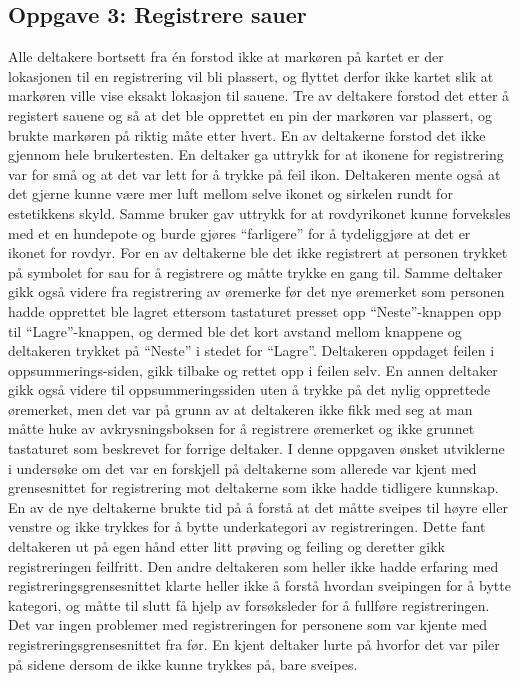 \subsection{Oppgave 3: Registrere sauer}
Alle deltakere bortsett fra én forstod ikke at markøren på kartet er der lokasjonen til en registrering vil bli plassert, og flyttet derfor ikke kartet slik at markøren ville vise eksakt lokasjon til sauene. Tre av deltakere forstod det etter å registert sauene og så at det ble opprettet en pin der markøren var plassert, og brukte markøren på riktig måte etter hvert. En av deltakerne forstod det ikke gjennom hele brukertesten. 
\newline
\newline
En deltaker ga uttrykk for at ikonene for registrering var for små og at det var lett for å trykke på feil ikon. Deltakeren mente også at det gjerne kunne være mer luft mellom selve ikonet og sirkelen rundt for estetikkens skyld. Samme bruker gav uttrykk for at rovdyrikonet kunne forveksles med et en hundepote og burde gjøres \enquote{farligere} for å tydeliggjøre at det er ikonet for rovdyr.
\newline
\newline
For en av deltakerne ble det ikke registrert at personen trykket på symbolet for sau for å registrere og måtte trykke en gang til. Samme deltaker gikk også videre fra registrering av øremerke før det nye øremerket som personen hadde opprettet ble lagret ettersom tastaturet presset opp \enquote{Neste}-knappen opp til \enquote{Lagre}-knappen, og dermed ble det kort avstand mellom knappene og deltakeren trykket på \enquote{Neste} i stedet for \enquote{Lagre}. Deltakeren oppdaget feilen i oppsummerings-siden, gikk tilbake og rettet opp i feilen selv. En annen deltaker gikk også videre til oppsummeringssiden uten å trykke på det nylig opprettede øremerket, men det var på grunn av at deltakeren ikke fikk med seg at man måtte huke av avkrysningsboksen for å registrere øremerket og ikke grunnet tastaturet som beskrevet for forrige deltaker.  
\newline
\newline
I denne oppgaven ønsket utviklerne i undersøke om det var en forskjell på deltakerne som allerede var kjent med grensesnittet for registrering mot deltakerne som ikke hadde tidligere kunnskap. En av de nye deltakerne brukte tid på å forstå at det måtte sveipes til høyre eller venstre og ikke trykkes for å bytte underkategori av registreringen. Dette fant deltakeren ut på egen hånd etter litt prøving og feiling og deretter gikk registreringen feilfritt. Den andre deltakeren som heller ikke hadde erfaring med registreringsgrensesnittet klarte heller ikke å forstå hvordan sveipingen for å bytte kategori, og måtte til slutt få hjelp av forsøksleder for å fullføre registreringen. Det var ingen problemer med registreringen for personene som var kjente med registreringsgrensesnittet fra før. En kjent deltaker lurte på hvorfor det var piler på sidene dersom de ikke kunne trykkes på, bare sveipes. 

